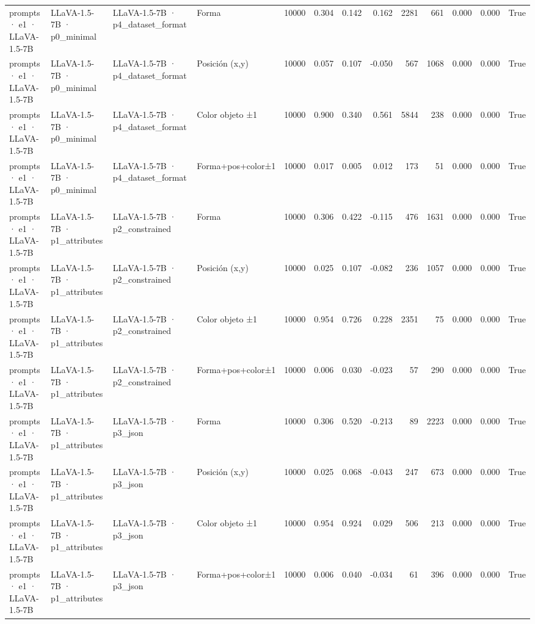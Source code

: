 \begin{tabular}{llllrrrrrrrrr}
prompts · e1 · LLaVA-1.5-7B & LLaVA-1.5-7B · p0\_minimal & LLaVA-1.5-7B · p4\_dataset\_format & Forma & 10000 & 0.304 & 0.142 & 0.162 & 2281 & 661 & 0.000 & 0.000 & True \\
prompts · e1 · LLaVA-1.5-7B & LLaVA-1.5-7B · p0\_minimal & LLaVA-1.5-7B · p4\_dataset\_format & Posición (x,y) & 10000 & 0.057 & 0.107 & -0.050 & 567 & 1068 & 0.000 & 0.000 & True \\
prompts · e1 · LLaVA-1.5-7B & LLaVA-1.5-7B · p0\_minimal & LLaVA-1.5-7B · p4\_dataset\_format & Color objeto ±1 & 10000 & 0.900 & 0.340 & 0.561 & 5844 & 238 & 0.000 & 0.000 & True \\
prompts · e1 · LLaVA-1.5-7B & LLaVA-1.5-7B · p0\_minimal & LLaVA-1.5-7B · p4\_dataset\_format & Forma+pos+color±1 & 10000 & 0.017 & 0.005 & 0.012 & 173 & 51 & 0.000 & 0.000 & True \\
prompts · e1 · LLaVA-1.5-7B & LLaVA-1.5-7B · p1\_attributes & LLaVA-1.5-7B · p2\_constrained & Forma & 10000 & 0.306 & 0.422 & -0.115 & 476 & 1631 & 0.000 & 0.000 & True \\
prompts · e1 · LLaVA-1.5-7B & LLaVA-1.5-7B · p1\_attributes & LLaVA-1.5-7B · p2\_constrained & Posición (x,y) & 10000 & 0.025 & 0.107 & -0.082 & 236 & 1057 & 0.000 & 0.000 & True \\
prompts · e1 · LLaVA-1.5-7B & LLaVA-1.5-7B · p1\_attributes & LLaVA-1.5-7B · p2\_constrained & Color objeto ±1 & 10000 & 0.954 & 0.726 & 0.228 & 2351 & 75 & 0.000 & 0.000 & True \\
prompts · e1 · LLaVA-1.5-7B & LLaVA-1.5-7B · p1\_attributes & LLaVA-1.5-7B · p2\_constrained & Forma+pos+color±1 & 10000 & 0.006 & 0.030 & -0.023 & 57 & 290 & 0.000 & 0.000 & True \\
prompts · e1 · LLaVA-1.5-7B & LLaVA-1.5-7B · p1\_attributes & LLaVA-1.5-7B · p3\_json & Forma & 10000 & 0.306 & 0.520 & -0.213 & 89 & 2223 & 0.000 & 0.000 & True \\
prompts · e1 · LLaVA-1.5-7B & LLaVA-1.5-7B · p1\_attributes & LLaVA-1.5-7B · p3\_json & Posición (x,y) & 10000 & 0.025 & 0.068 & -0.043 & 247 & 673 & 0.000 & 0.000 & True \\
prompts · e1 · LLaVA-1.5-7B & LLaVA-1.5-7B · p1\_attributes & LLaVA-1.5-7B · p3\_json & Color objeto ±1 & 10000 & 0.954 & 0.924 & 0.029 & 506 & 213 & 0.000 & 0.000 & True \\
prompts · e1 · LLaVA-1.5-7B & LLaVA-1.5-7B · p1\_attributes & LLaVA-1.5-7B · p3\_json & Forma+pos+color±1 & 10000 & 0.006 & 0.040 & -0.034 & 61 & 396 & 0.000 & 0.000 & True \\

\end{tabular}
